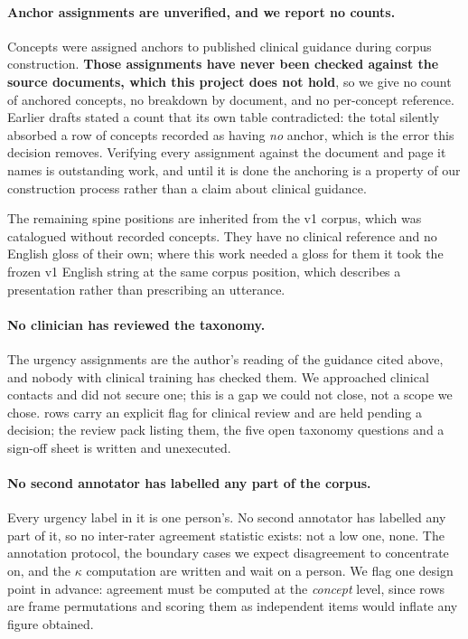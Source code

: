 \paragraph{Anchor assignments are unverified, and we report no counts.} Concepts
were assigned anchors to published clinical guidance during corpus construction.
\textbf{Those assignments have never been checked against the source documents,
which this project does not hold}, so we give no count of anchored concepts, no
breakdown by document, and no per-concept reference. Earlier drafts stated a
count that its own table contradicted: the total silently absorbed a row of
concepts recorded as having \emph{no} anchor, which is the error this decision
removes. Verifying every assignment against the document and page it names is
outstanding work, and until it is done the anchoring is a property of our
construction process rather than a claim about clinical guidance.

The remaining spine positions are inherited from the v1 corpus, which
was catalogued without recorded concepts. They have no clinical reference and no
English gloss of their own; where this work needed a gloss for them it took the
frozen v1 English string at the same corpus position, which describes a
presentation rather than prescribing an utterance.

\paragraph{No clinician has reviewed the taxonomy.} The urgency assignments are
the author's reading of the guidance cited above, and nobody with clinical
training has checked them. We approached clinical contacts and did not secure
one; this is a gap we could not close, not a scope we chose. \CorpusFlagged{} rows carry an explicit flag for clinical review and
\CorpusHeld{} are held pending a decision; the review pack listing them, the five
open taxonomy questions and a sign-off sheet is written and unexecuted.

\paragraph{No second annotator has labelled any part of the corpus.} Every
urgency label in it is one person's. No second annotator has labelled any
part of it, so no inter-rater agreement statistic exists: not a low one, none.
The annotation protocol, the boundary cases we expect disagreement to
concentrate on, and the $\kappa$ computation are written and wait on a person.
We flag one design point in advance: agreement must be computed at the
\emph{concept} level, since rows are frame permutations and scoring them as
independent items would inflate any figure obtained.


